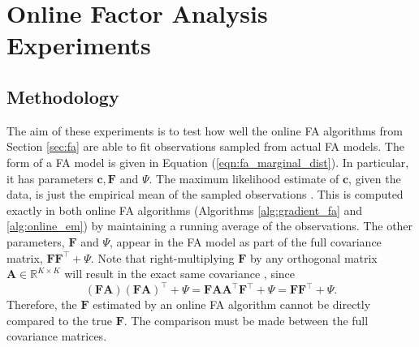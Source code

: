 \documentclass[msc,deptreport.inf]{infthesis} %
\newcommand{\matr}[1]{\mathbf{#1}}
\newcommand{\R}{\mathbb R}
\begin{document}
\chapter{Online Factor Analysis Experiments}\label{ch:online_fa_experiments}


\section{Methodology}

The aim of these experiments is to test how well the online FA algorithms from Section \ref{sec:fa} are able to fit observations sampled from actual FA models. The form of a FA model is given in Equation (\ref{eqn:fa_marginal_dist}). In particular, it has parameters $\matr{c}, \matr{F}$ and $\Psi$. The maximum likelihood estimate of $\matr{c}$, given the data, is just the empirical mean of the sampled observations \cite{barber2007}. This is computed exactly in both online FA algorithms (Algorithms \ref{alg:gradient_fa} and \ref{alg:online_em}) by maintaining a running average of the observations. The other parameters, $\matr{F}$ and $\Psi$, appear in the FA model as part of the full covariance matrix,  $\matr{F}\matr{F}^\intercal + \Psi$. Note that right-multiplying $\matr{F}$ by any orthogonal matrix $\matr{A} \in \R^{K \times K}$ will result in the exact same covariance \cite{barber2007}, since
\begin{equation}
	(\matr{F} \matr{A}) (\matr{F} \matr{A})^\intercal + \Psi
	= \matr{F} \matr{A} \matr{A}^\intercal \matr{F}^\intercal + \Psi
	= \matr{F} \matr{F}^\intercal + \Psi.
\end{equation}
Therefore, the $\matr{F}$ estimated by an online FA algorithm cannot be directly compared to the true $\matr{F}$. The comparison must be made between the full covariance matrices.  
\end{document}
